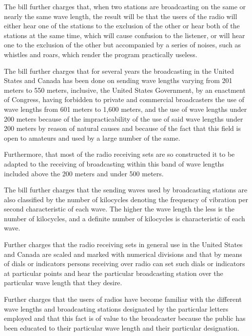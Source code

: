 The bill further charges that, when two stations are broadcasting on the same or
nearly the same wave length, the result will be that the users of the radio
will either hear one of the stations to the exclusion of the other or hear both
of the stations at the same time, which will cause confusion to the listener,
or will hear one to the exclusion of the other but accompanied by a series of
noises, such as whistles and roars, which render the program practically
useless.

The bill further charges that for several years the broadcasting in the United
States and Canada has been done on sending wave lengths varying from 201 meters
to 550 meters, inclusive, the United States Government, by an enactment of
Congress, having forbidden to private and commercial broadcasters the use of
wave lengths from 601 meters to 1,600 meters, and the use of wave
lengths under 200 meters because of the impracticability of the use of
said wave lengths under 200 meters by reason of natural causes and because of
the fact that this field is open to amateurs and used by a large number of the
same. 

Furthermore, that most of the radio receiving sets are so constructed it to be
adapted to the receiving of broadcasting within this band of wave lengths
included above the 200 meters and under 500 meters.

The bill further charges that the sending waves used by broadcasting stations
are also classified by the number of kilocycles denoting the frequency of
vibration per second characteristic of each wave. The higher the wave length
the less is the number of kilocycles, and a definite number of kilocycles is
characteristic of each wave.

Further charges that the radio receiving sets in general use in the United
States and Canada are scaled and marked with numerical divisions and that by
means of dials or indicators persons receiving over radio can set such dials or
indicators at particular points and hear the particular broadcasting station
over the particular wave length that they desire.

Further charges that the users of radios have become familiar with the different
wave lengths and broadcasting stations designated by the particular letters
employed and that this fact is of value to the broadcaster because the public
has been educated to their particular wave length and their
particular designation.

